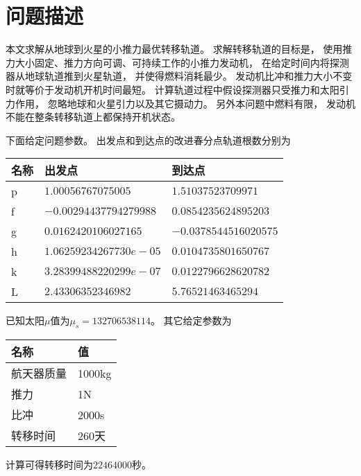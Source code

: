 \section{问题描述}
本文求解从地球到火星的小推力最优转移轨道。
求解转移轨道的目标是，
使用推力大小固定、推力方向可调、可持续工作的小推力发动机，
在给定时间内将探测器从地球轨道推到火星轨道，
并使得燃料消耗最少。
发动机比冲和推力大小不变时就等价于发动机开机时间最短。
计算轨道过程中假设探测器只受推力和太阳引力作用，
忽略地球和火星引力以及其它摄动力。
另外本问题中燃料有限，
发动机不能在整条转移轨道上都保持开机状态。

下面给定问题参数。
出发点和到达点的改进春分点轨道根数分别为
\begin{center}\begin{tabular}{lll}
    \toprule
    名称 & 出发点 & 到达点 \\
    \midrule
    p & $1.00056767075005     $ & $1.51037523709971    $ \\
    f & $-0.00294437794279988 $ & $0.0854235624895203  $ \\
    g & $0.0162420106027165   $ & $-0.0378544516020575 $ \\
    h & $1.06259234267730e-05 $ & $0.0104735801650767  $ \\
    k & $3.28399488220299e-07 $ & $0.0122796628620782  $ \\
    L & $2.43306352346982     $ & $5.76521463465294    $ \\
    \bottomrule
\end{tabular}\end{center}
已知太阳$\mu$值为$\mu_s=132706538114$。
其它给定参数为
\begin{center}\begin{tabular}{ll}
    \toprule
    名称 & 值 \\
    \midrule
    航天器质量 & 1000kg \\
    推力 & 1N \\
    比冲 & 2000s \\
    转移时间 & 260天 \\
    \bottomrule
\end{tabular}\end{center}
计算可得转移时间为$22464000$秒。
